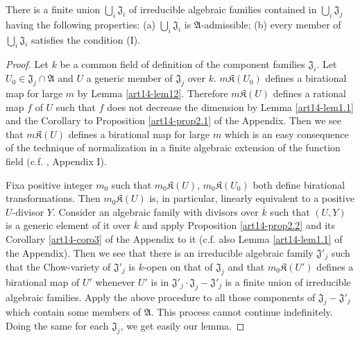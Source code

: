 \begin{lemma}\label{art14-lem16}
There is a finite union $\bigcup_{i}\mathfrak{J}_{i}$ of irreducible algebraic families contained in $\bigcup_{i}\mathfrak{J}_{j}$ having the following properties: {\rm(a)} $\bigcup_{i}\mathfrak{J}_{i}$ is $\mathfrak{A}$-admissible; {\rm(b)} every member of $\bigcup_{i}\mathfrak{J}_{i}$ satisfies the condition {\rm(I)}.
\end{lemma}

\begin{proof}
Let $k$ be a common field of definition of the component families $\mathfrak{J}_{i}$. Let $U_{0}\in \mathfrak{J}_{j}\cap \mathfrak{A}$ and $U$ a generic member of $\mathfrak{J}_{j}$ over $k$. $m\mathfrak{K}(U_{0})$ defines a birational map for large $m$ by Lemma \ref{art14-lem12}. Therefore $m\mathfrak{K}(U)$ defines a rational map $f$ of $U$ such that $f$ does not decrease the dimension by Lemma \ref{art14-lem1.1} and the Corollary to Proposition \ref{art14-prop2.1} of the Appendix. Then we see that $m\mathfrak{K}(U)$ defines a birational map for large $m$ which is an easy consequence of the technique of normalization in a finite algebraic extension of the function field (c.f. \cite{art14-key25}, Appendix I).

Fix\pageoriginale a positive integer $m_{0}$ such that $m_{0}\mathfrak{K}(U)$, $m_{0}\mathfrak{K}(U_{0})$ both define birational transformations. Then $m_{0}\mathfrak{K}(U)$ is, in particular, linearly equivalent to a positive $U$-divisor $Y$. Consider an algebraic family with divisors over $\overline{k}$ such that $(U,Y)$ is a generic element of it over $\overline{k}$ and apply Proposition \ref{art14-prop2.2} and its Corollary \ref{art14-coro3} of the Appendix to it (c.f. also Lemma \ref{art14-lem1.1} of the Appendix). Then we see that there is an irreducible algebraic family $\mathfrak{J}'_{j}$ such that the Chow-variety of $\mathfrak{J}'_{j}$ is $k$-open on that of $\mathfrak{J}_{j}$ and that $m_{0}\mathfrak{K}(U')$ defines a birational map of $U'$ whenever $U'$ is in $\mathfrak{J}'_{j}\cdot \mathfrak{J}_{j}-\mathfrak{J}'_{j}$ is a finite union of irreducible algebraic families. Apply the above procedure to all those components of $\mathfrak{J}_{j}-\mathfrak{J}'_{j}$ which contain some members of $\mathfrak{A}$. This process cannot continue indefinitely. Doing the same for each $\mathfrak{J}_{j}$, we get easily our lemma.
\end{proof}

